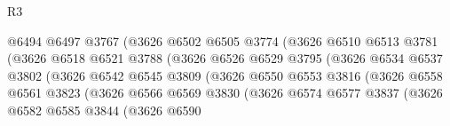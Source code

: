 \begin{lexlean}{R3}
\begin{coremodule}
                                    @6494
                                    @6497
                                    @3767
                                    (@3626
                                      @6502
                                      @6505
                                      @3774
                                      (@3626
                                        @6510
                                        @6513
                                        @3781
                                        (@3626
                                          @6518
                                          @6521
                                          @3788
                                          (@3626
                                            @6526
                                            @6529
                                            @3795
                                            (@3626
                                              @6534
                                              @6537
                                              @3802
                                              (@3626
                                                @6542
                                                @6545
                                                @3809
                                                (@3626
                                                  @6550
                                                  @6553
                                                  @3816
                                                  (@3626
                                                    @6558
                                                    @6561
                                                    @3823
                                                    (@3626
                                                      @6566
                                                      @6569
                                                      @3830
                                                      (@3626
                                                        @6574
                                                        @6577
                                                        @3837
                                                        (@3626
                                                          @6582
                                                          @6585
                                                          @3844
                                                          (@3626
                                                            @6590

\end{coremodule}
\end{lexlean}

